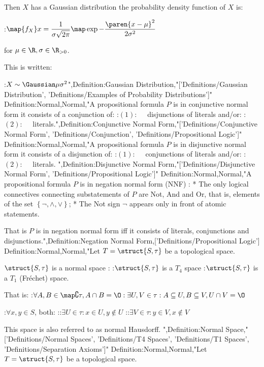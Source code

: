 Then $X$ has a Gaussian distribution  the probability density function of $X$ is:

:$\map {f_X} x = \dfrac 1 {\sigma \sqrt {2 \pi} } \map \exp {-\dfrac {\paren {x - \mu}^2} {2 \sigma^2} }$

for $\mu \in \R, \sigma \in \R_{> 0}$.


This is written: 

:$X \sim \Gaussian \mu {\sigma^2}$",Definition:Gaussian Distribution,"['Definitions/Gaussian Distribution', 'Definitions/Examples of Probability Distributions']"
Definition:Normal,Normal,"A propositional formula $P$ is in conjunctive normal form  it consists of a conjunction of:
:$(1): \quad$ disjunctions of literals
and/or:
:$(2): \quad$ literals.",Definition:Conjunctive Normal Form,"['Definitions/Conjunctive Normal Form', 'Definitions/Conjunction', 'Definitions/Propositional Logic']"
Definition:Normal,Normal,"A propositional formula $P$ is in disjunctive normal form  it consists of a disjunction of:
:$(1): \quad$ conjunctions of literals
and/or:
:$(2): \quad$ literals.
",Definition:Disjunctive Normal Form,"['Definitions/Disjunctive Normal Form', 'Definitions/Propositional Logic']"
Definition:Normal,Normal,"A propositional formula $P$ is in negation normal form (NNF) :
* The only logical connectives connecting substatements of $P$ are Not, And and Or, that is, elements of the set $\left\{{\neg, \land, \lor}\right\}$;
* The Not sign $\neg$ appears only in front of atomic statements.

That is $P$ is in negation normal form iff it consists of literals, conjunctions and disjunctions.",Definition:Negation Normal Form,['Definitions/Propositional Logic']
Definition:Normal,Normal,"Let $T = \struct {S, \tau}$ be a topological space.


$\struct {S, \tau}$ is a normal space :
:$\struct {S, \tau}$ is a $T_4$ space
:$\struct {S, \tau}$ is a $T_1$ (Fréchet) space.


That is:
:$\forall A, B \in \map \complement \tau, A \cap B = \O: \exists U, V \in \tau: A \subseteq U, B \subseteq V, U \cap V = \O$ 

:$\forall x, y \in S$, both:
::$\exists U \in \tau: x \in U, y \notin U$
::$\exists V \in \tau: y \in V, x \notin V$



This space is also referred to as normal Hausdorff.
",Definition:Normal Space,"['Definitions/Normal Spaces', 'Definitions/T4 Spaces', 'Definitions/T1 Spaces', 'Definitions/Separation Axioms']"
Definition:Normal,Normal,"Let $T = \struct {S, \tau}$ be a topological space.


